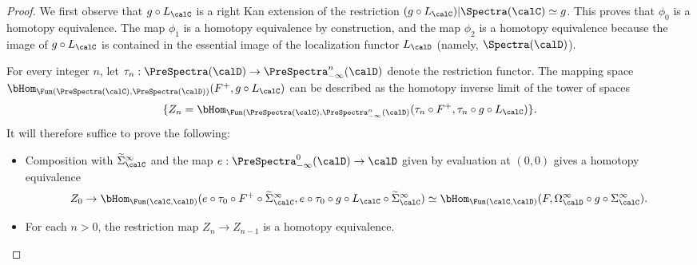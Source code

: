 \begin{proof}
We first observe that $g \circ L_{\calC}$ is a right Kan extension of the restriction
$(g \circ L_{\calC}) | \Spectra(\calC) \simeq g$. This proves that $\phi_0$ is a homotopy
equivalence. The map $\phi_1$ is a homotopy equivalence by construction, and the map
$\phi_2$ is a homotopy equivalence because the image of $g \circ L_{\calC}$ is contained in the
essential image of the localization functor $L_{\calD}$ (namely, $\Spectra(\calD)$). 

For every integer $n$, let $\tau_n: \PreSpectra(\calD) \rightarrow \PreSpectra^{n}_{-\infty}(\calD)$
denote the restriction functor. The mapping space
$\bHom_{ \Fun( \PreSpectra(\calC), \PreSpectra(\calD))}( F^{+}, g \circ L_{\calC})$ can be described as the homotopy inverse limit of the tower of spaces
$$ \{ Z_n = \bHom_{ \Fun( \PreSpectra(\calC), \PreSpectra^{n}_{- \infty}(\calD)}( \tau_n \circ F^{+},
\tau_n \circ g \circ L_{\calC}) \}.$$
It will therefore suffice to prove the following:
\begin{itemize}
\item[$(1)$] Composition with $\widetilde{\Sigma}^{\infty}_{\calC}$ and
the map $e: \PreSpectra^{0}_{- \infty}(\calD) \rightarrow \calD$ given by evaluation at $(0,0)$ 
gives a homotopy equivalence
$$Z_0 \rightarrow \bHom_{ \Fun( \calC, \calD)}( e \circ \tau_0 \circ F^{+} \circ \widetilde{\Sigma}^{\infty}_{\calC},
e \circ \tau_0 \circ g \circ L_{\calC} \circ \widetilde{\Sigma}^{\infty}_{\calC})\simeq
\bHom_{ \Fun(\calC, \calD)}( F, \Omega^{\infty}_{\calD} \circ g \circ \Sigma^{\infty}_{\calC} ).$$
\item[$(2)$] For each $n > 0$, the restriction map $Z_{n} \rightarrow Z_{n-1}$ is a homotopy equivalence.
\end{itemize}


\end{proof}
